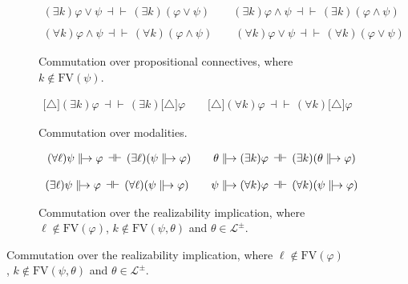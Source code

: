 \documentclass[%
  a4paper,
  UKenglish,
  cleveref,
  autoref,
  thm-restate,
  numberwithinsect,
]{lipics-v2021}
\newcommand\defthesisiff{\dashv\vdash}
\newcommand\thesisiff{\mathrel{\defthesisiff}}
\newcommand\FV{\mathrm{FV}}
\newcommand\defrealto{\mathrel\parallel\joinrel\to}
\newcommand\realto{\mathrel{\defrealto}}
\newcommand\itvar{k}
\newcommand\itvarbis{\ell}
\newcommand\Lang{\mathcal{L}}
\newcommand\form[1]{\lbrack #1 \rbrack}
\newcommand\modgen{\mathord{\triangle}}	%
\begin{document}

\begin{figure}
\begin{subfigure}{\textwidth}
\centering
\(
\begin{array}{c}
%
  (\exists\itvar)\varphi \lor \psi
  \,\thesisiff\,
  (\exists\itvar)(\varphi \lor \psi) 
%
\qquad
%
  (\exists\itvar)\varphi \land \psi
  \,\thesisiff\,
  (\exists\itvar)(\varphi \land \psi) 
%
\\\\
%
  (\forall\itvar)\varphi \land \psi
  \,\thesisiff\,
  (\forall\itvar)(\varphi \land \psi) 
%
\qquad
%
  (\forall\itvar)\varphi \lor \psi
  \,\thesisiff\,
  (\forall\itvar)(\varphi \lor \psi) 
%
\end{array}
\)
\caption{Commutation over propositional connectives,
where $\itvar \notin \FV(\psi)$.%
\label{fig:proof:log:der:quant:prop}}
\end{subfigure}

\begin{subfigure}{\textwidth}
\centering
\(
\begin{array}{c}
%
  \form{\modgen}(\exists \itvar)\varphi
  \,\thesisiff\,
  (\exists \itvar)\form{\modgen}\varphi
%
\qquad
%
  \form{\modgen}(\forall \itvar)\varphi
  \,\thesisiff\,
  (\forall \itvar)\form{\modgen}\varphi
%
\end{array}
\)
\caption{Commutation over modalities.%
\label{fig:proof:log:der:quant:mod}}
\end{subfigure}

\begin{subfigure}{\textwidth}
\centering
\(
\begin{array}{c}
%
  (\forall \itvarbis)\psi \realto \varphi
  \,\thesisiff\,
  (\exists \itvarbis)(\psi \realto \varphi)
%
\qquad
%
  \theta \realto (\exists \itvar)\varphi
  \,\thesisiff\,
  (\exists \itvar)(\theta \realto \varphi)
%
\\\\
%
  (\exists \itvarbis)\psi \realto \varphi
  \,\thesisiff\,
  (\forall \itvarbis)(\psi \realto \varphi)
%
\qquad
%
  \psi \realto (\forall \itvar)\varphi
  \,\thesisiff\,
  (\forall \itvar)(\psi \realto \varphi)
%
\end{array}
\)
\caption{Commutation over the realizability implication,
where $\itvarbis \notin \FV(\varphi)$,
$\itvar \notin \FV(\psi,\theta)$ and $\theta \in \Lang^\pm$.%
\label{fig:proof:log:der:quant:realto}}
\end{subfigure}


\end{figure}
\end{document}
